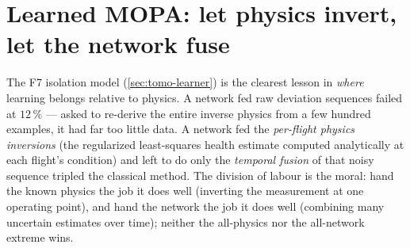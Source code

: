 \section{Learned MOPA: let physics invert, let the network fuse}
\label{sec:ml-mopa}

The F7 isolation model (\cref{sec:tomo-learner}) is the clearest lesson in \emph{where}
learning belongs relative to physics. A network fed raw deviation sequences failed at
$12\,\%$ --- asked to re-derive the entire inverse physics from a few hundred examples, it had
far too little data. A network fed the \emph{per-flight physics inversions} (the regularized
least-squares health estimate computed analytically at each flight's condition) and left to do
only the \emph{temporal fusion} of that noisy sequence tripled the classical method. The
division of labour is the moral: hand the known physics the job it does well (inverting the
measurement at one operating point), and hand the network the job it does well (combining many
uncertain estimates over time); neither the all-physics nor the all-network extreme wins.
